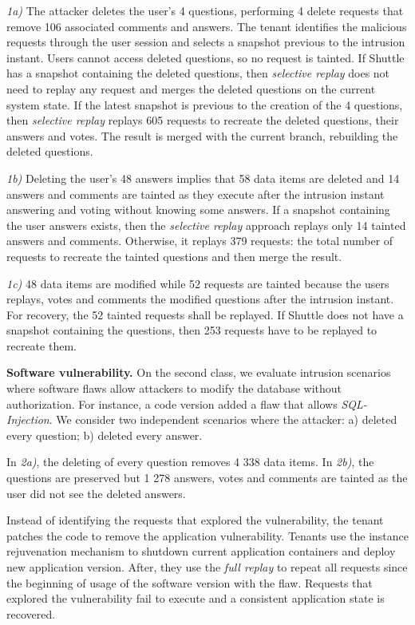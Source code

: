 \textit{1a)} The attacker deletes the user's 4 questions, performing 4 delete requests that remove 106 associated comments and answers. The tenant identifies the malicious requests through the user session and selects a snapshot previous to the intrusion instant. Users cannot access deleted questions, so no request is tainted. If Shuttle has a snapshot containing the deleted questions, then \textit{selective replay} does not need to replay any request and merges the deleted questions on the current system state. If the latest snapshot is previous to the creation of the 4 questions, then \textit{selective replay} replays 605 requests to recreate the deleted questions, their answers and votes. The result is merged with the current branch, rebuilding the deleted questions. 

\textit{1b)} Deleting the user's 48 answers implies that 58 data items are deleted and 14 answers and comments are tainted as they execute after the intrusion instant answering and voting without knowing some answers. If a snapshot containing the user answers exists, then the \textit{selective replay} approach replays only 14 tainted answers and comments. Otherwise, it replays 379 requests: the total number of requests to recreate the tainted questions and then merge the result.


\textit{1c)} 48 data items are modified while 52 requests are tainted because the users replays, votes and comments the modified questions after the intrusion instant. For recovery, the 52 tainted requests shall be replayed. If Shuttle does not have a snapshot containing the questions, then 253 requests have to be replayed to recreate them. 

\textbf{Software vulnerability.}
On the second class, we evaluate intrusion scenarios where software flaws allow attackers to modify the database without authorization. For instance, a code version added a flaw that allows \emph{SQL-Injection}. We consider two independent scenarios where the attacker: a) deleted every question; b) deleted every answer.

In \textit{2a)}, the deleting of every question removes 4 338 data items. In \textit{2b)}, the questions are preserved but 1 278 answers, votes and comments are tainted as the user did not see the deleted answers.

Instead of identifying the requests that explored the vulnerability, the tenant patches the code to remove the application vulnerability. Tenants use the instance rejuvenation mechanism to shutdown current application containers and deploy new application version. After, they use the \textit{full replay} to repeat all requests since the beginning of usage of the software version with the flaw. Requests that explored the vulnerability fail to execute and a consistent application state is recovered.\\



